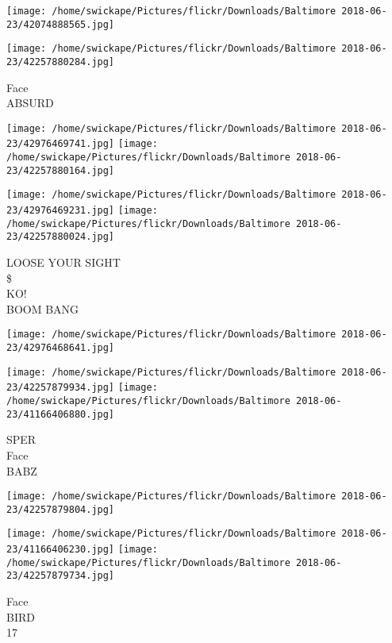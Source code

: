 \documentclass[10pt,letterpaper]{article}
\begin{document}
\texttt{[image: /home/swickape/Pictures/flickr/Downloads/Baltimore 2018-06-23/42074888565.jpg]}

\vspace{0.25in}
\texttt{[image: /home/swickape/Pictures/flickr/Downloads/Baltimore 2018-06-23/42257880284.jpg]}

Face\\
ABSURD\\
\pagebreak

\texttt{[image: /home/swickape/Pictures/flickr/Downloads/Baltimore 2018-06-23/42976469741.jpg]}
\texttt{[image: /home/swickape/Pictures/flickr/Downloads/Baltimore 2018-06-23/42257880164.jpg]}

\texttt{[image: /home/swickape/Pictures/flickr/Downloads/Baltimore 2018-06-23/42976469231.jpg]}
\texttt{[image: /home/swickape/Pictures/flickr/Downloads/Baltimore 2018-06-23/42257880024.jpg]}

LOOSE YOUR SIGHT\\
\$\\
KO!\\
BOOM BANG\\
\pagebreak

\texttt{[image: /home/swickape/Pictures/flickr/Downloads/Baltimore 2018-06-23/42976468641.jpg]}

\vspace{0.25in}
\texttt{[image: /home/swickape/Pictures/flickr/Downloads/Baltimore 2018-06-23/42257879934.jpg]}
\texttt{[image: /home/swickape/Pictures/flickr/Downloads/Baltimore 2018-06-23/41166406880.jpg]}

SPER\\
Face\\
BABZ\\
\pagebreak

\texttt{[image: /home/swickape/Pictures/flickr/Downloads/Baltimore 2018-06-23/42257879804.jpg]}

\vspace{0.25in}
\texttt{[image: /home/swickape/Pictures/flickr/Downloads/Baltimore 2018-06-23/41166406230.jpg]}
\texttt{[image: /home/swickape/Pictures/flickr/Downloads/Baltimore 2018-06-23/42257879734.jpg]}

Face\\
BIRD\\
17\\
\pagebreak
\end{document}
